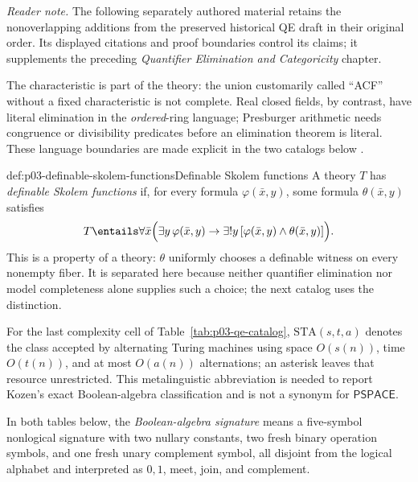 \noindent\textit{Reader note.} The following separately authored material
retains the nonoverlapping additions from the preserved historical QE draft in
their original order.  Its displayed citations and proof boundaries control
its claims; it supplements the preceding
\emph{Quantifier Elimination and Categoricity} chapter.

The characteristic is part of the theory: the union customarily called
``ACF'' without a fixed characteristic is not complete.  Real closed fields,
by contrast, have literal elimination in the \emph{ordered}-ring language;
Presburger arithmetic needs congruence or divisibility predicates before an
elimination theorem is literal.  These language boundaries are made explicit
in the two catalogs below \cite{Marker2002,Presburger1929}.

\begin{hbdefinition}{def:p03-definable-skolem-functions}{Definable Skolem functions}
A theory \(T\) has \emph{definable Skolem functions} if, for every formula
\(\varphi(\bar x,y)\), some formula \(\theta(\bar x,y)\) satisfies
\[
 T\entails\forall\bar x\Bigl(
   \exists y\,\varphi(\bar x,y)\to
   \exists!y\,[\varphi(\bar x,y)\land\theta(\bar x,y)]\Bigr).
\]
This is a property of a theory: \(\theta\) uniformly chooses a definable
witness on every nonempty fiber.  It is separated here because neither
quantifier elimination nor model completeness alone supplies such a choice;
the next catalog uses the distinction.
\end{hbdefinition}

For the last complexity cell of Table~\ref{tab:p03-qe-catalog},
\(\mathrm{STA}(s,t,a)\) denotes the class accepted by alternating Turing
machines using space \(O(s(n))\), time \(O(t(n))\), and at most \(O(a(n))\)
alternations; an asterisk leaves that resource unrestricted.  This
metalinguistic abbreviation is needed to report Kozen's exact Boolean-algebra
classification and is not a synonym for \(\mathsf{PSPACE}\).

In both tables below, the \emph{Boolean-algebra signature} means a five-symbol
nonlogical signature with two nullary constants, two fresh binary operation
symbols, and one fresh unary complement symbol, all disjoint from the logical
alphabet and interpreted as \(0,1\), meet, join, and complement.

